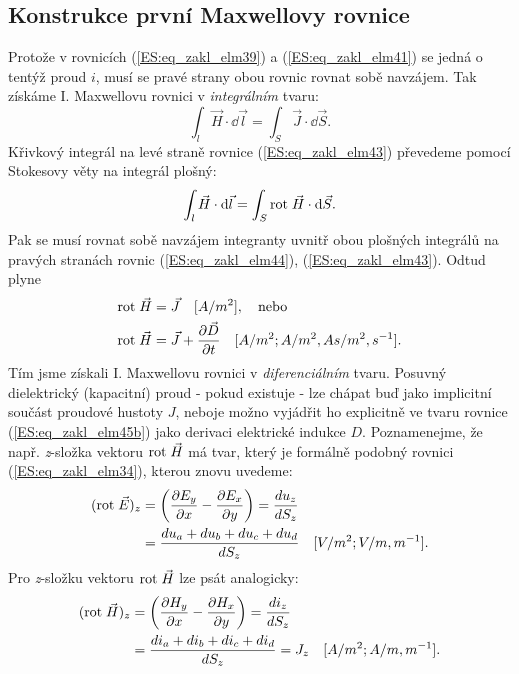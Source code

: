     \subsection{Konstrukce první Maxwellovy rovnice}
      Protože v rovnicích (\ref{ES:eq_zakl_elm39}) a (\ref{ES:eq_zakl_elm41}) se jedná o tentýž 
      proud \(i\), musí se pravé strany obou rovnic rovnat sobě navzájem. Tak získáme I. 
      Maxwellovu rovnici v \emph{integrálním} tvaru:
      \begin{equation}\label{ES:eq_zakl_elm43}
        \int_l \vec{H}\cdot \dd{\vec{l}} = \int_S \vec{J}\cdot \dd{\vec{S}}.
      \end{equation} 
      Křivkový integrál na levé straně rovnice (\ref{ES:eq_zakl_elm43}) převedeme pomocí Stokesovy 
      věty na integrál plošný:	
      \begin{equation}\label{ES:eq_zakl_elm44}
        \int_l \vec{H}\cdot \mathop{}\!\mathrm{d}\vec{l} = \int_S \mathrm{rot}\;\vec{H}\cdot \mathop{}\!\mathrm{d}\vec{S}.
      \end{equation} 
      Pak se musí rovnat sobě navzájem integranty uvnitř obou plošných integrálů na pravých 
      stranách rovnic (\ref{ES:eq_zakl_elm44}), (\ref{ES:eq_zakl_elm43}). Odtud plyne
      \begin{subequations}
        \begin{align}
          \mathrm{rot}\;\vec{H} &= \vec{J} \quad [A/m^2], \quad\text{nebo}      \label{ES:eq_zakl_elm45a} \\
          \mathrm{rot}\;\vec{H} &= \vec{J} + \dfrac{\partial \vec{D}}{\partial t} 
                     \quad [A/m^2; A/m^2, As/m^2, s^{-1}].        \label{ES:eq_zakl_elm45b}
        \end{align}
      \end{subequations}
      Tím jsme získali I. Maxwellovu rovnici v \emph{diferenciálním} tvaru. Posuvný dielektrický 
      (kapacitní) proud - pokud existuje - lze chápat buď jako implicitní součást proudové hustoty 
      \(J\), neboje možno vyjádřit ho explicitně ve tvaru rovnice (\ref{ES:eq_zakl_elm45b}) 
      jako derivaci elektrické indukce \(D\). Poznamenejme, že např. \emph{z}-složka vektoru 
      \(\mathrm{rot}\;\vec{H}\) má tvar, který je formálně podobný rovnici (\ref{ES:eq_zakl_elm34}), kterou 
      znovu uvedeme:
      \begin{align*}
         (\mathrm{rot}\;\vec{E})_z &= \left(\dfrac{\partial E_y}{\partial x} - \dfrac{\partial E_x}{\partial y}\right)
                      = \frac{du_z}{dS_z}                                                  \\
                     &= \frac{du_a + du_b + du_c + du_d}{dS_z} \quad[V/m^2; V/m, m^{-1}].
      \end{align*}
      Pro \emph{z}-složku vektoru \(\mathrm{rot}\;\vec{H}\) lze psát analogicky:
      \begin{align*}
        (\mathrm{rot}\;\vec{H})_z &= \left(\dfrac{\partial H_y}{\partial x} - \dfrac{\partial H_x}{\partial y}\right)
                     = \frac{di_z}{dS_z}                                                   \\
                    &= \frac{di_a + di_b + di_c + di_d}{dS_z} = J_z \quad[A/m^2; A/m, m^{-1}].
      \end{align*}
      
